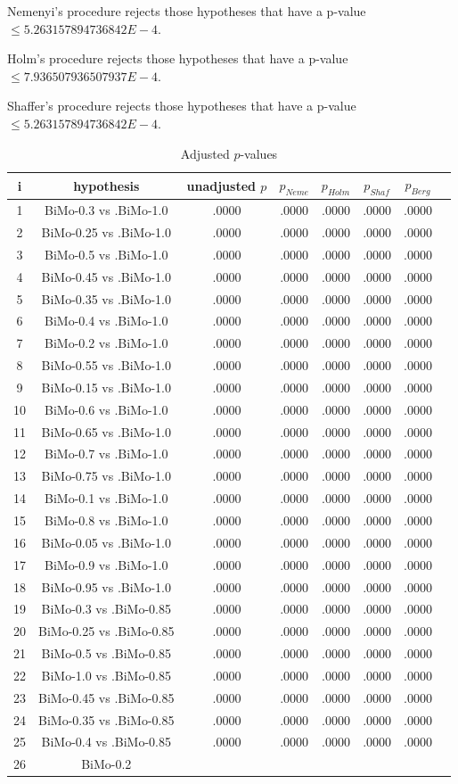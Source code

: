 \documentclass[a4paper,10pt]{article}
\begin{document}
\begin{landscape}
\begin{table}[!htp]
\begin{tabular}{cccccc}
\end{tabular}
\end{table}
Nemenyi's procedure rejects those hypotheses that have a p-value $\le5.263157894736842E-4$.


Holm's procedure rejects those hypotheses that have a p-value $\le7.936507936507937E-4$.


Shaffer's procedure rejects those hypotheses that have a p-value $\le5.263157894736842E-4$.


\begin{table}[!htp]
\centering\tiny
\caption{Adjusted $p$-values}
\begin{tabular}{cccccccc}
i&hypothesis&unadjusted $p$&$p_{Neme}$&$p_{Holm}$&$p_{Shaf}$&$p_{Berg}$\\
\hline
1&BiMo-0.3 vs .BiMo-1.0&.0000&.0000&.0000&.0000&.0000\\2&BiMo-0.25 vs .BiMo-1.0&.0000&.0000&.0000&.0000&.0000\\3&BiMo-0.5 vs .BiMo-1.0&.0000&.0000&.0000&.0000&.0000\\4&BiMo-0.45 vs .BiMo-1.0&.0000&.0000&.0000&.0000&.0000\\5&BiMo-0.35 vs .BiMo-1.0&.0000&.0000&.0000&.0000&.0000\\6&BiMo-0.4 vs .BiMo-1.0&.0000&.0000&.0000&.0000&.0000\\7&BiMo-0.2 vs .BiMo-1.0&.0000&.0000&.0000&.0000&.0000\\8&BiMo-0.55 vs .BiMo-1.0&.0000&.0000&.0000&.0000&.0000\\9&BiMo-0.15 vs .BiMo-1.0&.0000&.0000&.0000&.0000&.0000\\10&BiMo-0.6 vs .BiMo-1.0&.0000&.0000&.0000&.0000&.0000\\11&BiMo-0.65 vs .BiMo-1.0&.0000&.0000&.0000&.0000&.0000\\12&BiMo-0.7 vs .BiMo-1.0&.0000&.0000&.0000&.0000&.0000\\13&BiMo-0.75 vs .BiMo-1.0&.0000&.0000&.0000&.0000&.0000\\14&BiMo-0.1 vs .BiMo-1.0&.0000&.0000&.0000&.0000&.0000\\15&BiMo-0.8 vs .BiMo-1.0&.0000&.0000&.0000&.0000&.0000\\16&BiMo-0.05 vs .BiMo-1.0&.0000&.0000&.0000&.0000&.0000\\17&BiMo-0.9 vs .BiMo-1.0&.0000&.0000&.0000&.0000&.0000\\18&BiMo-0.95 vs .BiMo-1.0&.0000&.0000&.0000&.0000&.0000\\19&BiMo-0.3 vs .BiMo-0.85&.0000&.0000&.0000&.0000&.0000\\20&BiMo-0.25 vs .BiMo-0.85&.0000&.0000&.0000&.0000&.0000\\21&BiMo-0.5 vs .BiMo-0.85&.0000&.0000&.0000&.0000&.0000\\22&BiMo-1.0 vs .BiMo-0.85&.0000&.0000&.0000&.0000&.0000\\23&BiMo-0.45 vs .BiMo-0.85&.0000&.0000&.0000&.0000&.0000\\24&BiMo-0.35 vs .BiMo-0.85&.0000&.0000&.0000&.0000&.0000\\25&BiMo-0.4 vs .BiMo-0.85&.0000&.0000&.0000&.0000&.0000\\26&BiMo-0.2 
\end{tabular}
\end{table}
\end{landscape}
\end{document}
